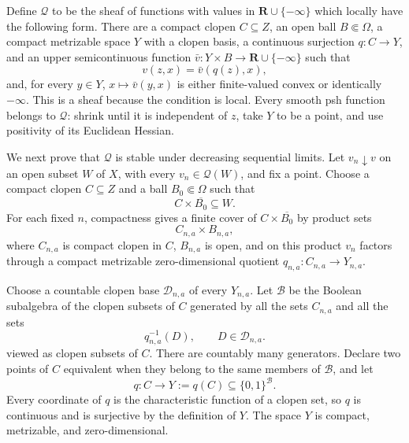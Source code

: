 Define \(\mathscr Q\) to be the sheaf of functions with values in
\(\mathbf R\cup\{-\infty\}\) which locally have the following form.  There
are a compact clopen \(C\subseteq Z\), an open ball
\(B\Subset\Omega\), a compact metrizable space \(Y\) with a clopen basis, a
continuous surjection \(q:C\to Y\), and an upper semicontinuous function
\(\bar v:Y\times B\to\mathbf R\cup\{-\infty\}\) such that
\begin{equation}
\label{eq:p071-stone-local-factor}
                  v(z,x)=\bar v(q(z),x),
\end{equation}
and, for every \(y\in Y\), \(x\mapsto\bar v(y,x)\) is either finite-valued
convex or identically \(-\infty\).  This is a sheaf because the condition
is local.  Every smooth psh function belongs to
\(\mathscr Q\): shrink until it is independent of \(z\), take \(Y\) to be
a point, and use positivity of its Euclidean Hessian.

We next prove that \(\mathscr Q\) is stable under decreasing sequential
limits.  Let \(v_n\downarrow v\) on an open subset \(W\) of \(X\), with
every \(v_n\in\mathscr Q(W)\), and fix a point.  Choose a compact clopen
\(C\subseteq Z\) and a ball \(B_0\Subset\Omega\) such that
\begin{equation}
\label{eq:p071-stone-compact-core}
                         C\times\overline{B_0}\subseteq W.
\end{equation}
For each
fixed \(n\), compactness gives a finite cover of
\(C\times\overline{B_0}\) by product sets
\begin{equation}
\label{eq:p071-stone-factor-cover}
                       C_{n,a}\times B_{n,a},
\end{equation}
where \(C_{n,a}\) is compact clopen in \(C\), \(B_{n,a}\) is open, and on this
product \(v_n\) factors through a compact metrizable zero-dimensional
quotient \(q_{n,a}:C_{n,a}\to Y_{n,a}\).

Choose a countable clopen base \(\mathcal D_{n,a}\) of every \(Y_{n,a}\).
Let \(\mathcal B\) be the Boolean subalgebra of the clopen subsets of \(C\)
generated by all the sets \(C_{n,a}\) and all the sets
\begin{equation}
\label{eq:p071-stone-boolean-generators}
                  q_{n,a}^{-1}(D),
                  \qquad D\in\mathcal D_{n,a}.
\end{equation}
viewed as clopen subsets of \(C\).  There are countably many generators.
Declare two points of \(C\) equivalent when they belong to the same members
of \(\mathcal B\), and let
\begin{equation}
\label{eq:p071-stone-common-quotient}
                  q:C\longrightarrow
                  Y:=q(C)\subseteq\{0,1\}^{\mathcal B}.
\end{equation}
Every coordinate of \(q\) is the characteristic function of a clopen set,
so \(q\) is continuous and is surjective by the definition of \(Y\).
The space \(Y\) is compact, metrizable, and zero-dimensional.

